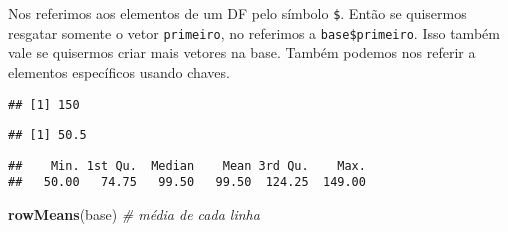 \documentclass[]{article}
\newenvironment{Shaded}{\begin{snugshade}}{\end{snugshade}}
\newcommand{\CommentTok}[1]{\textcolor[rgb]{0.56,0.35,0.01}{\textit{#1}}}
\newcommand{\KeywordTok}[1]{\textcolor[rgb]{0.13,0.29,0.53}{\textbf{#1}}}
\newcommand{\NormalTok}[1]{#1}
\newcommand{\OperatorTok}[1]{\textcolor[rgb]{0.81,0.36,0.00}{\textbf{#1}}}
\newcommand{\StringTok}[1]{\textcolor[rgb]{0.31,0.60,0.02}{#1}}
\begin{document}
Nos referimos aos elementos de um DF pelo símbolo \texttt{\$}. Então se
quisermos resgatar somente o vetor \texttt{primeiro}, no referimos a
\texttt{base\$primeiro}. Isso também vale se quisermos criar mais
vetores na base. Também podemos nos referir a elementos específicos
usando chaves.

\begin{Shaded}
\end{Shaded}

\begin{verbatim}
## [1] 150
\end{verbatim}

\begin{Shaded}
\end{Shaded}

\begin{verbatim}
## [1] 50.5
\end{verbatim}

\begin{Shaded}
\end{Shaded}

\begin{verbatim}
##    Min. 1st Qu.  Median    Mean 3rd Qu.    Max. 
##   50.00   74.75   99.50   99.50  124.25  149.00
\end{verbatim}

\begin{Shaded}
\begin{Highlighting}[]
\KeywordTok{rowMeans}\NormalTok{(base) }\CommentTok{# média de cada linha}
\end{Highlighting}
\end{Shaded}
\end{document}

